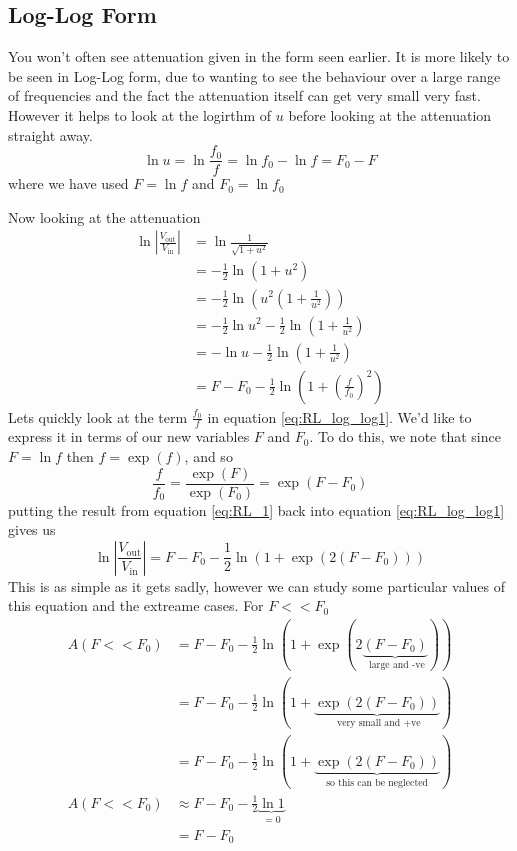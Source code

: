 \subsection{Log-Log Form}
You won't often see attenuation given in the form seen earlier. It is more likely
to be seen in Log-Log form, due to wanting to see the behaviour over a large range
of frequencies and the fact the attenuation itself can get very small very fast.
However it helps to look at the logirthm of $u$ before looking at the attenuation
straight away.
\begin{equation}
  \ln u = \ln \frac{f_0}{f} = \ln f_0 - \ln f = F_0 - F
\end{equation}
where we have used $F=\ln f$ and $F_0 = \ln f_0 $

Now looking at the attenuation
\begin{align}
  \ln \left|\frac{V_{\text{out}}}{V_{\text{in}}} \right| & = \ln \frac{1}{\sqrt{1+u^2}} \nonumber \\
  &= -\frac{1}{2} \ln \left(1+u^2\right) \nonumber \\
  &= -\frac{1}{2} \ln \left(u^2\left(1+\frac{1}{u^2}\right)\right) \nonumber \\
  &= -\frac{1}{2} \ln u^2 -\frac{1}{2} \ln\left(1+\frac{1}{u^2}\right) \nonumber \\
  &= -\ln u -\frac{1}{2} \ln\left(1+\frac{1}{u^2}\right) \nonumber \\
  &= F - F_0  -\frac{1}{2} \ln\left(1+\left(\frac{f}{f_0}\right)^2\right) \label{eq:RL_log_log1}
\end{align}
Lets quickly look at the term $\frac{f_0}{f}$ in equation \ref{eq:RL_log_log1}.
We'd like to express it in terms of our new variables $F$ and $F_0$. To do this,
we note that since $F = \ln f$ then $f = \exp(f)$, and so
\begin{equation}
  \frac{f}{f_0} = \frac{\exp(F)}{\exp(F_0)} = \exp( F - F_0 ) \label{eq:RL_1}
\end{equation}
putting the result from equation \ref{eq:RL_1} back into equation  \ref{eq:RL_log_log1}
gives us
\begin{equation}
  \ln \left|\frac{V_{\text{out}}}{V_{\text{in}}} \right| = F - F_0  -\frac{1}{2} \ln\left(1+\exp( 2(F - F_0) )\right) \label{eq:RL_log_log2}
\end{equation}
This is as simple as it gets sadly, however we can study some particular values
of this equation and the extreame cases.
For $F<<F_0$
\begin{align}
  A(F<<F_0) &= F - F_0  -\frac{1}{2} \ln\left(1+\exp(2\underbrace{(F - F_0)}_{\text{ large and -ve}})\right) \nonumber \\
  &= F - F_0  -\frac{1}{2} \ln\left(1+\underbrace{\exp(2(F - F_0))}_{\text{ very small and +ve}}\right) \nonumber \\
  &= F - F_0   -\frac{1}{2} \ln\left(1+\underbrace{\exp(2(F - F_0))}_{\text{so this can be neglected}}\right) \nonumber \\
  A(F<<F_0) &\approx F - F_0  -\frac{1}{2} \underbrace{\ln 1}_{=0} \nonumber \\
  &= F - F_0 \label{eq:RL_log_log_small_F}
\end{align}
